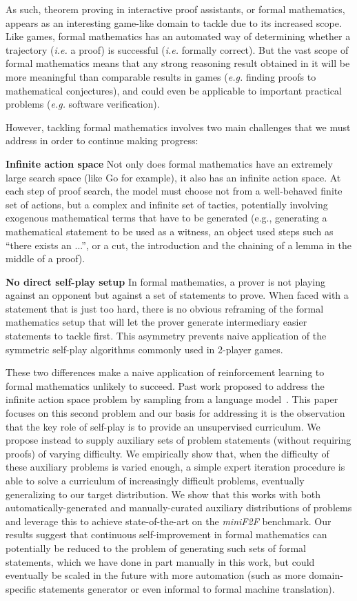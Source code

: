 \documentclass[nohyperref]{article}
\theoremstyle{plain}
\theoremstyle{definition}
\theoremstyle{remark}
\begin{document}
As such, theorem proving in interactive proof assistants, or formal mathematics, appears as an interesting game-like domain to tackle due to its increased scope. Like games, formal mathematics has an automated way of determining whether a trajectory (\emph{i.e.} a proof) is successful (\emph{i.e.} formally correct). But the vast scope of formal mathematics means that any strong reasoning result obtained in it will be more meaningful than comparable results in games (\emph{e.g.} finding proofs to mathematical conjectures), and could even be applicable to important practical problems (\emph{e.g.} software verification).

However, tackling formal mathematics involves two main challenges that we must address in order to continue making progress:  

{\bf Infinite action space} Not only does formal mathematics have an extremely large search space (like Go for example), it also has an infinite action space. At each step of proof search, the model must choose not from a well-behaved finite set of actions, but a complex and infinite set of tactics, potentially involving exogenous mathematical terms that have to be generated (e.g., generating a mathematical statement to be used as a witness, an object used steps such as ``there exists an  ...'', or a cut, the introduction and the chaining of a lemma in the middle of a proof).

{\bf No direct self-play setup} In formal mathematics, a prover is not playing against an opponent but against a set of statements to prove. When faced with a statement that is just too hard, there is no obvious reframing of the formal mathematics setup that will let the prover generate intermediary easier statements to tackle first. This asymmetry prevents naive application of the symmetric self-play algorithms commonly used in 2-player games.

These two differences make a naive application of reinforcement learning to formal mathematics unlikely to succeed. Past work proposed to address the infinite action space problem by sampling from a language model~\cite{polu2020generative}. This paper focuses on this second problem and our basis for addressing it is the observation that the key role of self-play is to provide an unsupervised curriculum. We propose instead to supply auxiliary sets of problem statements (without requiring proofs) of varying difficulty. We empirically show that, when the difficulty of these auxiliary problems is varied enough, a simple expert iteration procedure is able to solve a curriculum of increasingly difficult problems, eventually generalizing to our target distribution. We show that this works with both automatically-generated and manually-curated auxiliary distributions of problems and leverage this to achieve state-of-the-art on the \emph{miniF2F} benchmark. Our results suggest that continuous self-improvement in formal mathematics can potentially be reduced to the problem of generating such sets of formal statements, which we have done in part manually in this work, but could eventually be scaled in the future with more automation (such as more domain-specific statements generator or even informal to formal machine translation).
\end{document}
